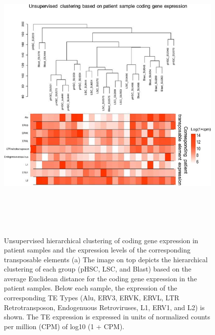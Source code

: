 \begin{figure}
    \includegraphics[height = 15cm, width = 15cm]{tex/tes/41598_2017_7356_Fig3_HTML.jpg}
    \caption{Unsupervised hierarchical clustering of coding gene expression in patient samples and the expression levels of the corresponding transposable elements (a)  The image on top depicts the hierarchical clustering of each group (pHSC, LSC, and Blast) based on the average Euclidean distance for the coding gene expression in the patient samples. Below each sample, the expression of the corresponding TE Types (Alu, ERV3, ERVK, ERVL, LTR Retrotransposon, Endogenuous Retroviruses, L1, ERV1, and L2) is shown.  The TE expression is expressed in units of normalized counts per million (CPM) of log10 (1 + CPM).
}
    \label{fig:tes3}
\end{figure}

